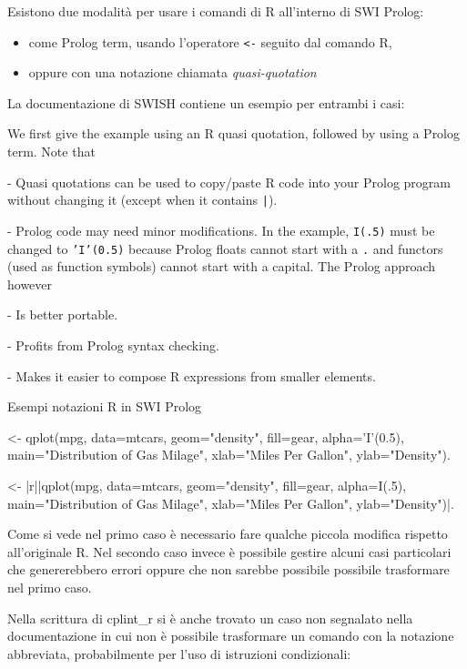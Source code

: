 \documentclass[10pt,titlepage,twoside,a4paper]{report}
\newenvironment{code}{\singlespacing\captionsetup{type=listing}}{}
\begin{document}
Esistono due modalità per usare i comandi di R all'interno di SWI Prolog:
\begin{itemize}
    \item come Prolog term, usando l'operatore \texttt{<-} seguito dal comando R,
    \item oppure con una notazione chiamata \emph{quasi-quotation}
\end{itemize}
La documentazione di SWISH contiene un esempio per entrambi i 
casi\cite{rprolognotations}:
\begin{displayquote}
[..] We first give the example using an R quasi quotation, followed by 
using a Prolog term.  Note that

  - Quasi quotations can be used to copy/paste R code into your Prolog
    program without changing it (except when it contains \texttt{|{\textbraceright}}).

  - Prolog code may need minor modifications.  In the example, \texttt{I(.5)}
    must be changed to \texttt{'I'(0.5)} because Prolog floats cannot start with
    a \texttt{.} and functors (used as function symbols) cannot start with a
    capital.  The Prolog approach however

    - Is better portable.

    - Profits from Prolog syntax checking.

    - Makes it easier to compose R expressions from smaller elements.
\end{displayquote}

\begin{code}
    \caption{Esempi notazioni R in SWI Prolog}
    \begin{prologcode*}{}
<- qplot(mpg, data=mtcars, geom="density", fill=gear, alpha='I'(0.5), main="Distribution of Gas Milage", xlab="Miles Per Gallon", ylab="Density").

<- {|r||qplot(mpg, data=mtcars, geom="density", fill=gear, alpha=I(.5), main="Distribution of Gas Milage", xlab="Miles Per Gallon", ylab="Density")|}.
    \end{prologcode*}
\end{code}

Come si vede nel primo caso è necessario fare qualche piccola modifica 
rispetto all'originale R. Nel secondo caso invece è possibile gestire alcuni 
casi particolari che genererebbero errori oppure che non sarebbe possibile 
possibile trasformare nel primo caso.

Nella scrittura di cplint\_r si è anche trovato un caso non segnalato nella 
documentazione in cui non è possibile trasformare un comando con la 
notazione abbreviata, probabilmente per l'uso di istruzioni condizionali:
\end{document}
